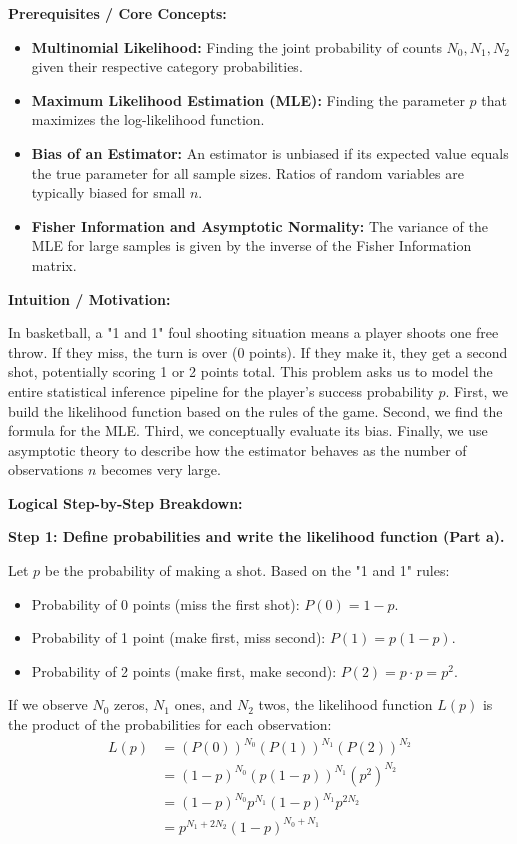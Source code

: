 \begin{solution}
\textbf{Prerequisites / Core Concepts:}
\begin{itemize}
    \item \textbf{Multinomial Likelihood:} Finding the joint probability of counts $N_0, N_1, N_2$ given their respective category probabilities.
    \item \textbf{Maximum Likelihood Estimation (MLE):} Finding the parameter $p$ that maximizes the log-likelihood function.
    \item \textbf{Bias of an Estimator:} An estimator is unbiased if its expected value equals the true parameter for all sample sizes. Ratios of random variables are typically biased for small $n$.
    \item \textbf{Fisher Information and Asymptotic Normality:} The variance of the MLE for large samples is given by the inverse of the Fisher Information matrix.
\end{itemize}

\textbf{Intuition / Motivation:}

In basketball, a "1 and 1" foul shooting situation means a player shoots one free throw. If they miss, the turn is over (0 points). If they make it, they get a second shot, potentially scoring 1 or 2 points total. This problem asks us to model the entire statistical inference pipeline for the player's success probability $p$. First, we build the likelihood function based on the rules of the game. Second, we find the formula for the MLE. Third, we conceptually evaluate its bias. Finally, we use asymptotic theory to describe how the estimator behaves as the number of observations $n$ becomes very large.

\textbf{Logical Step-by-Step Breakdown:}

\textbf{Step 1: Define probabilities and write the likelihood function (Part a).}

Let $p$ be the probability of making a shot. Based on the "1 and 1" rules:
\begin{itemize}
    \item Probability of 0 points (miss the first shot): $P(0) = 1-p$.
    \item Probability of 1 point (make first, miss second): $P(1) = p(1-p)$.
    \item Probability of 2 points (make first, make second): $P(2) = p \cdot p = p^2$.
\end{itemize}
If we observe $N_0$ zeros, $N_1$ ones, and $N_2$ twos, the likelihood function $L(p)$ is the product of the probabilities for each observation:
\begin{align*}
L(p) &= (P(0))^{N_0} (P(1))^{N_1} (P(2))^{N_2} \\
&= (1-p)^{N_0} (p(1-p))^{N_1} (p^2)^{N_2} \\
&= (1-p)^{N_0} p^{N_1} (1-p)^{N_1} p^{2N_2} \\
&= p^{N_1 + 2N_2} (1-p)^{N_0 + N_1}
\end{align*}


\end{solution}
